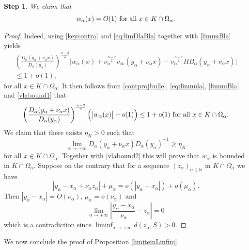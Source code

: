\documentclass[10pt]{amsart}
\numberwithin{equation}{section}
\newcommand{\Om}{\Omega}
\newcommand{\ma}{\mu_\alpha}
\def \bb{\hbox}
\def \xl{x_\alpha}
\def \ls{+\infty}
\def\la{\alpha}
\def \ma{\mu_{\alpha}}
\def \yl{y_{\alpha}}
\def \vo {v_{\infty}}
\def \nn{\mathbb{N}}
\newtheorem{step}{Step}
\theoremstyle{plain}
\theoremstyle{remark}
\begin{document}
\begin{step}\label{wlabound}
	We claim that 
	\begin{equation}\label{eq:wlabound}
		w_{\la}(x)=O(1) \bb{ for all } x\in K\cap \Om_{\la}.
	\end{equation}
\end{step}
\begin{proof}
Indeed, using \eqref{keycontra} and \eqref{eq:limDlaBla} together with \eqref{limnuBla} yields
\begin{equation}\label{vlabound1}
\begin{aligned}
\left( \frac{D_{\la}(\yl+\nu_\la x)}{D_{\la}(\yl)}\right) ^{\frac{n-2}{2}}\Big|w_\la(x)\mp\nu_\la^{\frac{n-2}{2}}\vo(\yl+\nu_\la x)-\nu_\la^{\frac{n-2}{2}}\Pi B_{\la}(\yl+\nu_\la x)\Big| \\
\leq 1+o(1), \end{aligned} 
\end{equation}
 for all $x\in K\cap \Om_{\la}$. It then follows from \eqref{contprojbulle}, \eqref{eq:limnula}, \eqref{limnuBla} and \eqref{vlabound1} that 
\begin{equation}\label{vlabound2}
\left( 	\frac{D_{\la}(\yl+\nu_{\la}x)}{D_{\la}(\yl)}\right) ^{\frac{n-2}{2}}	\Big( \big|w_\la(x)\big| + o(1) \Big)\leq  1+ o(1)\bb{ for all } x\in K\cap \Om_{\la}.
\end{equation}
We claim that there exists $\eta_K >0$ such that 
$$\lim_{\la\to \ls}D_{\la}(\yl+\nu_{\la}x)D_{\la}(\yl)^{-1} \ge \eta_K  $$
 for all $x \in K \cap \Omega_\alpha$. Together with \eqref{vlabound2} this will prove that $w_\la$ is bounded in $K \cap \Omega_\alpha$. Suppose on the contrary that for a sequence $(z_\alpha)_{\alpha \in \nn}$ in $K \cap \Omega_\alpha$ we have
\begin{equation*}
|\yl-\xl+\nu_{\la}z_\alpha|+\ma=o(|\yl-\xl|)+o(\ma).
\end{equation*}
Then $|\yl-\xl|=O(\nu_{\la})$, $\ma=o(\nu_{\la})$ and 
\begin{equation*}
\lim_{\la\to \ls} \left| \frac{\yl-\xl}{\nu_{\la}}-z_\alpha\right| =0
\end{equation*}
which is a contradiction since $\liminf_{\alpha \to + \infty} d(z_\alpha, S) > 0$. 
\end{proof}

We now conclude the proof of Proposition \ref{limiteinLinfini}.
\end{document}
